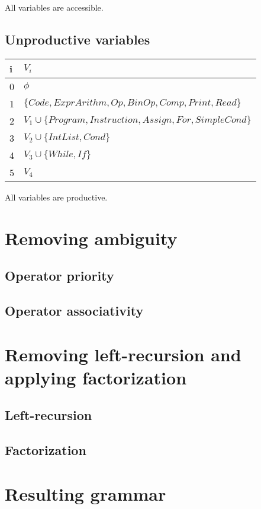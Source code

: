 \documentclass[12pt]{report}
\begin{document}
All variables are accessible.

\subsection{Unproductive variables}

\begin{tabular}{|l p{35em}|} \hline
 i & $V_i$ \\ \hline
0 & $\phi$ \\ \hline
1 & $\{Code, ExprArithm, Op, BinOp, Comp, Print, Read\}$ \\ \hline
2 & $V_1 \cup \{Program, Instruction, Assign, For, SimpleCond\}$ \\ \hline
3 & $V_2 \cup \{IntList, Cond\}$ \\ \hline
4 & $V_3 \cup \{While, If\}$ \\ \hline
5 & $V_4$ \\ \hline
\end{tabular}

All variables are productive.

\section{Removing ambiguity}

\subsection{Operator priority}

\subsection{Operator associativity}

\section{Removing left-recursion and applying factorization}

\subsection{Left-recursion}

\subsection{Factorization}

\section{Resulting grammar}
\end{document}

